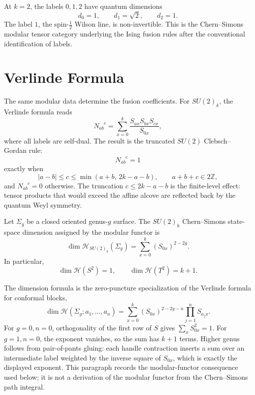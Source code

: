 \begin{example}[\(SU(2)_2\)]
\label{ex:su2-level-two-cs}
At \(k=2\), the labels \(0,1,2\) have quantum dimensions
\[
  d_0=1,\qquad d_1=\sqrt2,\qquad d_2=1 .
\]
The label \(1\), the spin-\(\frac12\) Wilson line, is non-invertible.  This
is the Chern--Simons modular tensor category underlying the Ising fusion
rules after the conventional identification of labels.
\end{example}

\section{Verlinde Formula}

The same modular data determine the fusion coefficients.  For \(SU(2)_k\),
the Verlinde formula reads
\begin{equation}
  N_{ab}^{\phantom{ab}c}
  =
  \sum_{x=0}^{k}
  \frac{S_{ax}S_{bx}S_{cx}}{S_{0x}},
  \label{eq:su2k-verlinde-formula}
\end{equation}
where all labels are self-dual.  The result is the truncated \(SU(2)\)
Clebsch--Gordan rule:
\[
  N_{ab}^{\phantom{ab}c}=1
\]
exactly when
\[
  |a-b|\le c\le \min(a+b,\,2k-a-b),
  \qquad
  a+b+c\in2\mathbb Z,
\]
and \(N_{ab}^{\phantom{ab}c}=0\) otherwise.  The truncation
\(c\le2k-a-b\) is the finite-level effect: tensor products that would exceed
the affine alcove are reflected back by the quantum Weyl symmetry.

\begin{remark}
\label{rem:su2k-verlinde-dimensions}
Let \(\Sigma_g\) be a closed oriented genus-\(g\) surface.  The
\(SU(2)_k\) Chern--Simons state-space dimension assigned by the modular
functor is
\begin{equation}
  \dim\mathcal H_{SU(2)_k}(\Sigma_g)
  =
  \sum_{x=0}^k (S_{0x})^{2-2g}.
  \label{eq:su2k-verlinde-dimension}
\end{equation}
In particular,
\[
  \dim\mathcal H(S^2)=1,
  \qquad
  \dim\mathcal H(T^2)=k+1 .
\]

The dimension formula is the zero-puncture specialization of the Verlinde
formula for conformal blocks,
\[
  \dim\mathcal H(\Sigma_g;a_1,\ldots,a_n)
  =
  \sum_{x=0}^{k}
  (S_{0x})^{2-2g-n}\prod_{j=1}^n S_{a_jx}.
\]
For \(g=0,n=0\), orthogonality of the first row of \(S\) gives
\(\sum_x S_{0x}^2=1\).  For \(g=1,n=0\), the exponent vanishes, so the sum
has \(k+1\) terms.  Higher genus follows from pair-of-pants gluing: each
handle contraction inserts a sum over an intermediate label weighted by the
inverse square of \(S_{0x}\), which is exactly the displayed exponent.
This paragraph records the modular-functor consequence used below; it is not
a derivation of the modular functor from the Chern--Simons path integral.
\end{remark}

